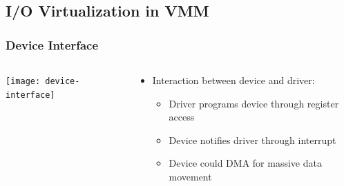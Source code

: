 \subsection{I/O Virtualization in VMM}
\begin{frame}
	\frametitle{Device Interface}
	
	
	
	\begin{columns}
		
		\begin{column}{.4\textwidth}
			\centering
			\texttt{[image: device-interface]}
			
		\end{column}
		
		\begin{column}{.6\textwidth}
			
		\begin{itemize}
			\item Interaction between device and driver:
			\begin{itemize}
				\item Driver programs device through register access 
				\item Device notifies driver through interrupt
				\item Device could DMA for massive data movement
				
			\end{itemize} 
		
	  \end{itemize} 	
			
			
		\end{column}
		
		
	\end{columns}
	
	
\end{frame}


